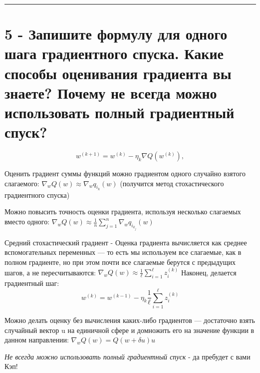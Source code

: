 \documentclass[11pt]{article}
\begin{document}
    \begin{center}\rule{0.5\linewidth}{\linethickness}\end{center}

    \section{5 - Запишите формулу для одного шага градиентного спуска. Какие
способы оценивания градиента вы знаете? Почему не всегда можно
использовать полный градиентный
спуск?}\label{ux437ux430ux43fux438ux448ux438ux442ux435-ux444ux43eux440ux43cux443ux43bux443-ux434ux43bux44f-ux43eux434ux43dux43eux433ux43e-ux448ux430ux433ux430-ux433ux440ux430ux434ux438ux435ux43dux442ux43dux43eux433ux43e-ux441ux43fux443ux441ux43aux430.-ux43aux430ux43aux438ux435-ux441ux43fux43eux441ux43eux431ux44b-ux43eux446ux435ux43dux438ux432ux430ux43dux438ux44f-ux433ux440ux430ux434ux438ux435ux43dux442ux430-ux432ux44b-ux437ux43dux430ux435ux442ux435-ux43fux43eux447ux435ux43cux443-ux43dux435-ux432ux441ux435ux433ux434ux430-ux43cux43eux436ux43dux43e-ux438ux441ux43fux43eux43bux44cux437ux43eux432ux430ux442ux44c-ux43fux43eux43bux43dux44bux439-ux433ux440ux430ux434ux438ux435ux43dux442ux43dux44bux439-ux441ux43fux443ux441ux43a}

\[w^{(k+1)} = w^{(k)} - \eta_k \nabla Q(w^{(k)}),\]

Оценить градиент суммы функций можно градиентом одного случайно взятого
слагаемого: \(\nabla_wQ(w) ≈ \nabla_wq_{i_k}(w)\) (получится метод
стохастического градиентного спуска)

Можно повысить точность оценки градиента, используя несколько слагаемых
вместо одного:
\(\nabla_wQ(w) ≈ \frac{1}{n} \sum_{j=1}^n\nabla_wq_{i_{k_j}}(w)\)

Средний стохастический градиент - Оценка градиента вычисляется как
среднее вспомогательных переменных --- то есть мы используем все
слагаемые, как в полном градиенте, но при этом почти все слагаемые
берутся с предыдущих шагов, а не пересчитываются:
\(\nabla_wQ(w)≈ \frac{1}{ℓ}\sum_{i=1}^ℓz^{(k)}_i\) Наконец, делается
градиентный шаг:
\[w^{(k)} = w^{(k−1)} − η_k\frac{1}{ℓ}\sum_{i=1}^ℓz^{(k)}_i\]

Можно делать оценку без вычисления каких-либо градиентов --- достаточно
взять случайный вектор u на единичной сфере и домножить его на значение
функции в данном направлении: \(\nabla_wQ(w) = Q(w + δu)u\)

\emph{Не всегда можно использовать полный градиентный спуск} - да
пребудет с вами Кэп!
\end{document}
